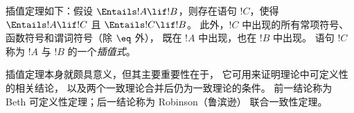 \documentclass[../../../include/open-logic-section]{subfiles}
\begin{document}


插值定理如下：假设
$\Entails !A \lif !B$，则存在语句 $!C$，使得
$\Entails !A \lif !C$ 且 $\Entails !C \lif !B$。
此外，$!C$ 中出现的所有常项符号、函数符号和谓词符号（除 $\eq$ 外），
既在 $!A$ 中出现，也在 $!B$ 中出现。
语句 $!C$ 称为 $!A$ 与 $!B$ 的一个\emph{插值式}。

插值定理本身就颇具意义，但其主要重要性在于，
它可用来证明理论中可定义性的相关结论，
以及两个一致理论合并后仍为一致理论的条件。
前一结论称为 Beth 可定义性定理；后一结论称为 Robinson（鲁滨逊） 联合一致性定理。
\end{document}
